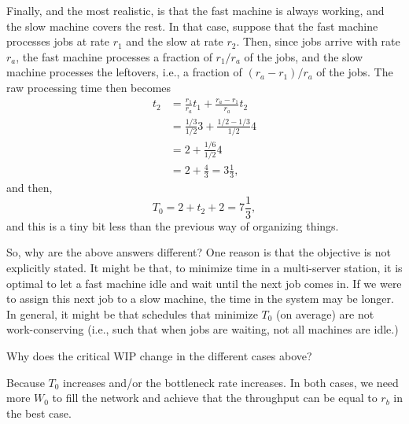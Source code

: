 \begin{exercise}
\begin{solution}
    Finally, and the most realistic, is that the fast machine is
    always working, and the slow machine covers the rest.  In that
    case, suppose that the fast machine processes jobs at rate $r_1$
    and the slow at rate $r_2$. Then, since jobs arrive with rate
    $r_a$, the fast machine processes a fraction of $r_1/r_a$ of the
    jobs, and the slow machine processes the leftovers, i.e., a
    fraction of $(r_a-r_1)/r_a$ of the jobs. The raw processing time then becomes
    \begin{equation*}
      \begin{split}
      t_2 
&= \frac{r_1}{r_a} t_1 + \frac{r_a-r_1}{r_a} t_2 \\
&= \frac{1/3}{1/2} 3 + \frac{1/2-1/3}{1/2} 4 \\
&= 2 + \frac{1/6}{1/2} 4 \\
&= 2 + \frac{4}{3} = 3\frac13,
      \end{split}
    \end{equation*}
and then,
\begin{equation*}
  T_0 = 2 + t_2 + 2 = 7\frac13,
\end{equation*}
and this is a tiny bit less than the previous way of organizing things. 

So, why are the above answers different? One reason is that the
objective is not explicitly stated. It might be that, to minimize time
in a multi-server station, it is optimal to let a fast machine idle
and wait until the next job comes in. If we were to assign this next
job to a slow machine, the time in the system may be longer.  In
general, it might be that schedules that minimize $T_0$ (on average)
are not work-conserving (i.e., such that when jobs are waiting, not
all machines are idle.)
\end{solution}
\end{exercise}


\begin{exercise}
Why does the critical WIP change in the different cases above? 
\begin{solution}
  Because $T_0$ increases and/or the bottleneck rate increases. In
  both cases, we need more $W_0$ to fill the network and achieve that
  the throughput can be equal to $r_b$ in the best case.
\end{solution}
\end{exercise}

